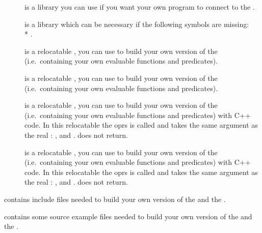 \begin{description}
\begin{description}

\item [] is a library you can use if you want your own program to
connect to the \MPA{}.

\item [] is a library which can be necessary if the following
symbols are missing: \\*
.

\item [] is a relocatable \CPK{},  you can use
to build your own version of the \CPK{} (i.e.\ containing your own evaluable
functions and predicates).

\item [] is a relocatable \XPK{},  you can use
to build your own version of the \XPK{} (i.e.\ containing your own evaluable
functions and predicates).

\item [] is a relocatable \CPK{},  you can use
to build your own version of the \CPK{} (i.e.\ containing your own evaluable
functions and predicates) with C++ code. In this relocatable the oprs
 is called  and takes the same argument as the real
: ,  and .  does not
return.

\item [] is a relocatable \XPK{}, you can use
to build your own version of the \XPK{} (i.e.\ containing your own evaluable
functions and predicates) with C++ code. In this relocatable the oprs
 is called  and takes the same argument as the real
: ,  and .  does not
return. 

\end{description}

\item [\file{include}] contains include files needed to build your own
version of the \XPK{} and the \CPK{}.

\item [\file{pub\_src}] contains some source example files needed to build your own
version of the \XPK{} and the \CPK{}.

\begin{description}


\end{description}
\end{description}
